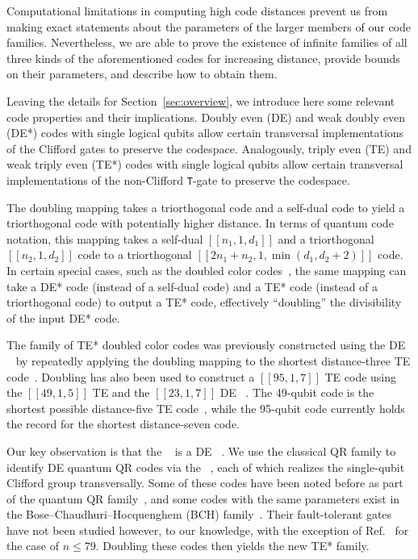 \documentclass[journal]{IEEEtran}
\newcommand{\T}{\texttt{T}}
\begin{document}
Computational limitations in computing high code distances prevent us from making exact statements about the parameters of the larger members of our code families. Nevertheless, we are able to prove the existence of infinite families of all three kinds of the aforementioned codes for increasing distance, provide bounds on their parameters, and describe how to obtain them. 



Leaving the details for Section~\ref{sec:overview}, we introduce here some relevant code properties and their implications. Doubly even (DE) and weak doubly even (DE*) codes with single logical qubits allow certain transversal implementations of the Clifford gates to preserve the codespace. Analogously, triply even (TE) and weak triply even (TE*) codes with single logical qubits allow certain transversal implementations of the non-Clifford \T-gate to preserve the codespace.

The doubling mapping takes a triorthogonal code and a self-dual code to yield a triorthogonal code with potentially higher distance. 
In terms of quantum code notation, this mapping takes a self-dual $[[n_1,1,d_1]]$ and a triorthogonal $[[n_2,1,d_2]]$ code to a triorthogonal $[[2n_1+n_2,1,\min (d_1,d_2+2)]]$ code. In certain special cases, such as the doubled color codes~\cite{bravyi_doubled_2015}, the same mapping can take a DE* code (instead of a self-dual code) and a TE* code (instead of a triorthogonal code) to output a TE* code,   effectively ``doubling'' the divisibility of the input DE* code. 

The family of TE* doubled color codes was previously constructed using the DE ~\cite{bombin_exact_2007,bombin_topological_2006} by repeatedly applying the doubling mapping to the shortest distance-three TE code~\cite{bravyi_doubled_2015}. Doubling has also been used to construct a $[[95,1,7]]$ TE code using the $[[49,1,5]]$ TE and the $[[23,1,7]]$ DE ~\cite{sullivan_code_2024}. 
The 49-qubit code is the shortest possible distance-five TE code~\cite{bravyi_magic-state_2012}, while the 95-qubit code currently holds the record for the shortest distance-seven code.

Our key observation is that the ~\cite{marcel_je_golay_notes_1949} is a DE ~\cite{macwilliams_theory_1977}.
We use the classical QR family to identify DE quantum QR codes via the ~\cite{calderbank_good_1996,steane_error_1996,steane_multiple_1996}, each of which realizes the single-qubit Clifford group transversally. Some of these codes have been noted before as part of the quantum QR family~\cite{lai_construction_2011}, and some codes with the same parameters exist in the Bose–Chaudhuri–Hocquenghem (BCH) family~\cite{grassl_quantum_1999}.
Their fault-tolerant gates have not been studied however, to our knowledge, with the exception of Ref.~\cite{cross_comparative_2009} for the case of \(n\leq79\). Doubling these codes then yields the new TE* family. 
\end{document}
